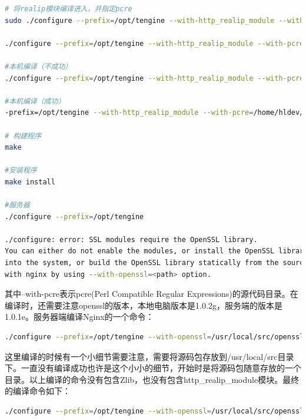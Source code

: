 \documentclass[letter]{book}
\begin{document}
\begin{lstlisting}[language=bash]
# 将realip模块编译进入，并指定pcre
sudo ./configure --prefix=/opt/tengine --with-http_realip_module --with-pcre=/root/software/pcre-8.40 --with-openssl=/root/software/openssl-OpenSSL_1_1_0e --without-http_gzip_module

./configure --prefix=/opt/tengine --with-http_realip_module --with-pcre=/root/software/pcre-8.40  --without-http_gzip_module

#本机编译（不成功）
./configure --prefix=/opt/tengine --with-http_realip_module --with-pcre=/home/hldev/Downloads/pcre-8.40 --with-openssl=/home/hldev/Downloads/openssl-OpenSSL_1_0_1e --without-http_gzip_module

#本机编译（成功）
-prefix=/opt/tengine --with-http_realip_module --with-pcre=/home/hldev/Downloads/pcre-8.40 --with-openssl=/home/hldev/software/openssl-OpenSSL_1_0_2g --without-http_gzip_module

# 构建程序
make

#安装程序
make install

#服务器
./configure --prefix=/opt/tengine

./configure: error: SSL modules require the OpenSSL library.
You can either do not enable the modules, or install the OpenSSL library
into the system, or build the OpenSSL library statically from the source
with nginx by using --with-openssl=<path> option.


\end{lstlisting}

其中--with-pcre表示pcre(Perl Compatible Regular Expressions)的源代码目录。在编译时，还需要注意openssl的版本，本地电脑版本是1.0.2g，服务端的版本是1.0.1e。服务器端编译Nginx的一个命令：

\begin{lstlisting}[language=bash]
./configure --prefix=/opt/tengine --with-openssl=/usr/local/src/openssl-OpenSSL_1_0_2g/ --without-http_gzip_module --with-pcre=/usr/local/src/pcre-8.40/
\end{lstlisting}

这里编译的时候有一个小细节需要注意，需要将源码包存放到/usr/local/src目录下。一直没有编译成功也许是这个小小的细节，开始时是将源码包随意存放的一个目录。以上编译的命令没有包含Zlib，也没有包含http\_realip\_module模块。最终的编译命令如下：

\begin{lstlisting}[language=bash]
./configure --prefix=/opt/tengine --with-openssl=/usr/local/src/openssl-OpenSSL_1_0_2g/ --with-pcre=/usr/local/src/pcre-8.40/ --with-zlib=/usr/local/src/zlib-1.2.11 --with-http_realip_module 
\end{lstlisting}
\end{document}
